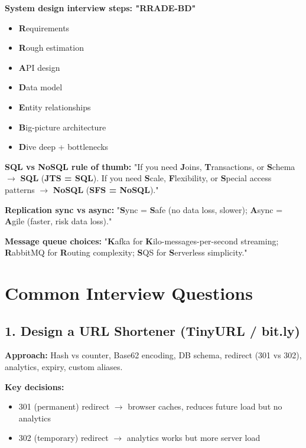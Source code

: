 \documentclass[11pt]{article}
\providecommand{\tightlist}{\setlength{\itemsep}{1pt}\setlength{\parskip}{0pt}}
\begin{document}
\textbf{System design interview steps: "RRADE-BD"}

\begin{itemize}
\tightlist
\item
  \textbf{R}equirements
\item
  \textbf{R}ough estimation
\item
  \textbf{A}PI design
\item
  \textbf{D}ata model
\item
  \textbf{E}ntity relationships
\item
  \textbf{B}ig-picture architecture
\item
  \textbf{D}ive deep + bottlenecks
\end{itemize}

\textbf{SQL vs NoSQL rule of thumb:} "If you need \textbf{J}oins, \textbf{T}ransactions, or \textbf{S}chema \(\rightarrow\) \textbf{SQL} (\textbf{JTS = SQL}). If you need \textbf{S}cale, \textbf{F}lexibility, or \textbf{S}pecial access patterns \(\rightarrow\) \textbf{NoSQL} (\textbf{SFS = NoSQL})."

\textbf{Replication sync vs async:} "\textbf{S}ync = \textbf{S}afe (no data loss, slower); \textbf{A}sync = \textbf{A}gile (faster, risk data loss)."

\textbf{Message queue choices:} "\textbf{K}afka for \textbf{K}ilo-messages-per-second streaming; \textbf{R}abbitMQ for \textbf{R}outing complexity; \textbf{S}QS for \textbf{S}erverless simplicity."

\section{Common Interview Questions}\label{common-interview-questions}

\subsection{1. Design a URL Shortener (TinyURL / bit.ly)}\label{1-design-a-url-shortener-tinyurl--bitly}

\textbf{Approach:} Hash vs counter, Base62 encoding, DB schema, redirect (301 vs 302), analytics, expiry, custom aliases.

\textbf{Key decisions:}

\begin{itemize}
\tightlist
\item
  301 (permanent) redirect \(\rightarrow\) browser caches, reduces future load but no analytics
\item
  302 (temporary) redirect \(\rightarrow\) analytics works but more server load
\end{itemize}
\end{document}
